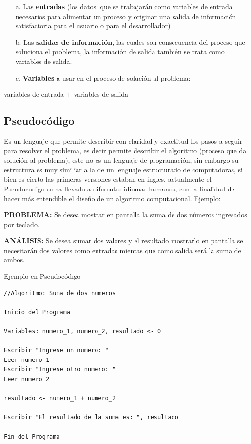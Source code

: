 \documentclass[12pt, a4paper]{article}
\begin{document}
\begin{enumerate}
    \item[a.] Las \textbf{entradas} (los datos [que se trabajarán como variables de entrada] necesarios para alimentar un proceso y originar una salida de información satisfactoria para el usuario o para el desarrollador)
    \item[b.] Las \textbf{salidas de información}, las cuales son consecuencia del proceso que soluciona el problema, la información de salida también se trata como variables de salida.
    \item[c.] \textbf{Variables} a usar en el proceso de solución al problema:
\end{enumerate}

\begin{center}
    variables de entrada + variables de salida \\[2cm]
\end{center}

\subsection{Pseudocódigo}
Es un lenguaje que permite describir con claridad y exactitud los pasos a seguir para resolver el problema, es decir permite describir el algoritmo (proceso que da solución al problema), este no es un lenguaje de programación, sin embargo su estructura es muy similiar a la de un lenguaje estructurado de computadoras, si bien es cierto las primeras versiones estaban en ingles, actualmente el Pseudocodigo se ha llevado a diferentes idiomas humanos, con la finalidad de hacer más entendible el diseño de un algoritmo computacional. Ejemplo:

\textbf{PROBLEMA:} Se desea mostrar en pantalla la suma de
dos números ingresados por teclado.

\textbf{ANÁLISIS:} Se desea sumar dos valores y el resultado mostrarlo en pantalla se necesitarán dos valores como entradas mientas que como salida será la suma de ambos.

\begin{center}
    Ejemplo en Pseudocódigo
\end{center}

\begin{lstlisting}[language = pseudocode, caption = {Algoritmo en Pseudocódigo}]
//Algoritmo: Suma de dos numeros

Inicio del Programa

Variables: numero_1, numero_2, resultado <- 0 

Escribir "Ingrese un numero: "
Leer numero_1
Escribir "Ingrese otro numero: "
Leer numero_2

resultado <- numero_1 + numero_2

Escribir "El resultado de la suma es: ", resultado

Fin del Programa

\end{lstlisting}
\end{document}
